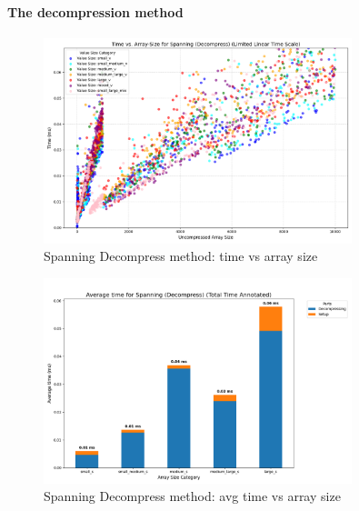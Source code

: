 \documentclass[11pt, a4paper]{article}
\begin{document}
	\paragraph{The decompression method}
	\begin{figure}[H]%
		\centering
		\includegraphics[width=0.8\textwidth]{Grafics/Spanning/SpanningDecompressTimevsSize.png}
		\caption{Spanning Decompress method: time vs array size}
		\label{fig:16}
		
	\end{figure}
	\begin{figure}[H]%
		\centering
		\includegraphics[width=0.8\textwidth]{Grafics/Spanning/SpanningDecompressTime.png}
		\caption{Spanning Decompress method: avg time vs array size}
		\label{fig:17}
	\end{figure}
	
\end{document}
